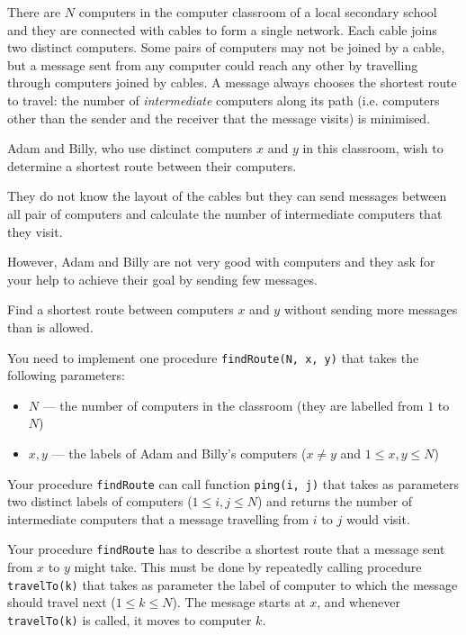\documentclass{boi2014}
\newcommand{\method}[1]{{\tt #1}}
\begin{document}
    There are $N$ computers in the computer classroom of a local
    secondary school and they are connected with cables to form
    a single network. Each cable joins two distinct computers.
    Some pairs of computers may not be joined by a
    cable, but a message sent from any computer could reach
    any other by travelling through computers joined by cables.
    A message always chooses the shortest route to travel:
    the number of \emph{intermediate} computers along its path
    (i.e. computers other than the sender and the receiver that
    the message visits) is minimised.
    
    Adam and Billy, who use distinct computers $x$ and $y$
    in this classroom, wish to determine a shortest route
    between their computers.

    They do not know the layout of the cables but they can
    send messages between all pair of computers and calculate
    the number of intermediate computers that they visit.

    However, Adam and Billy are not very good with computers
    and they ask for your help to achieve their goal by sending
    few messages.

    \Task
    Find a shortest route between computers $x$ and $y$ without
    sending more messages than is allowed.

    \Implementation
    You need to implement one procedure \method{findRoute(N, x, y)} that
    takes the following parameters:

    \begin{itemize}
        \item $N$ --- the number of computers in the classroom
            (they are labelled from $1$ to $N$)
        \item $x, y$ --- the labels of Adam and Billy's computers
            ($x \neq y$ and $1 \le x, y \le N$)
    \end{itemize}

    Your procedure \method{findRoute} can call function \method{ping(i, j)}
    that takes as parameters two distinct labels of computers
    ($1 \le i, j \le N$) and returns the number of intermediate computers
    that a message travelling from $i$ to $j$ would visit.

    Your procedure \method{findRoute} has to describe a shortest route
    that a message sent from $x$ to $y$ might take. This must be done by
    repeatedly calling procedure \method{travelTo(k)} that takes as
    parameter the label of computer to which the message should travel
    next ($1 \le k \le N$). The message starts at $x$, and whenever
    \method{travelTo(k)} is called, it moves to computer $k$.
\end{document}
